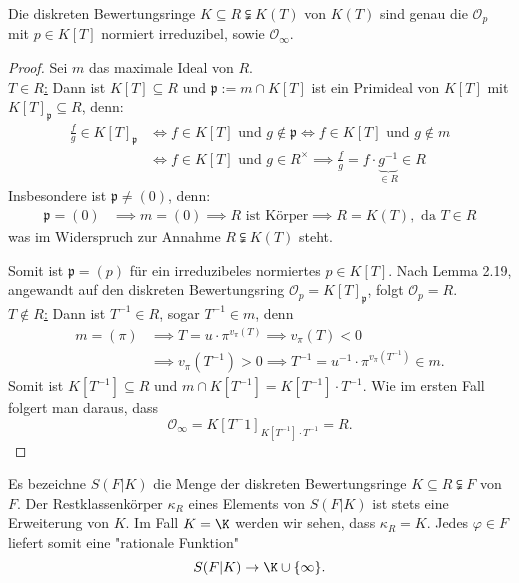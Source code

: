 \begin{satz}
    Die diskreten Bewertungsringe $K \subseteq R \subsetneqq K(T)$ von $K(T)$ sind genau die $\mathcal{O}_p$ mit 
    $p \in K[T]$ normiert irreduzibel, sowie $\mathcal{O}_\infty$.
\end{satz}
\begin{proof}
    Sei $m$ das maximale Ideal von $R$.\\
    \underline{$T\in R$:} Dann ist $K[T] \subseteq R$ und $\mathfrak{p} := m \cap K[T]$ ist ein Primideal von $K[T]$ mit
    $K[T]_\mathfrak{p} \subseteq R$, denn:
    \begin{align*}
        \frac{f}{g} \in K[T]_\mathfrak{p} & \iff f \in K[T] \text{ und } g \notin \mathfrak{p}
            \iff f \in K[T] \text{ und } g \notin m\\
            & \iff f \in K[T] \text{ und } g \in R^\times \implies \frac{f}{g} = f \cdot \underbrace{g^{-1}}_{\in R} \in R
    \end{align*}
    Insbesondere ist $\mathfrak{p} \ne (0)$, denn:
    \begin{align*}
        \mathfrak{p} = (0) & \implies m = (0) \implies R \text{ ist Körper} \implies R = K(T), \text{ da } T \in R
    \end{align*}
    was im Widerspruch zur Annahme $R \subsetneqq K(T)$ steht.

    Somit ist $\mathfrak{p} = (p)$ für ein irreduzibeles
    normiertes $p \in K[T]$. Nach Lemma 2.19, angewandt auf den diskreten Bewertungsring $\mathcal{O}_p = K[T]_\mathfrak{p}$,
    folgt $\mathcal{O}_p = R$.\\
    \underline{$T\notin R$:} Dann ist $T^{-1} \in R$, sogar $T^{-1} \in m$, denn
    \begin{align*}
        m=(\pi) &\implies T = u \cdot \pi^{v_\pi(T)} \implies v_\pi(T) < 0\\
            & \implies v_\pi(T^{-1}) > 0 \implies T^{-1} = u^{-1}\cdot \pi^{v_\pi(T^{-1})} \in m.
    \end{align*}
    Somit ist $K[T^{-1}] \subseteq R$ und $m \cap K[T^{-1}] = K[T^{-1}] \cdot T^{-1}$. Wie im ersten Fall folgert man daraus, dass
    $$ \mathcal{O}_\infty = K[T^-1]_{K[T^{-1}]\cdot T^{-1}} = R.$$
\end{proof}

\begin{bemerkungnr}
    Es bezeichne $S(F|K)$ die Menge der diskreten Bewertungsringe $K \subseteq R \subsetneqq F$ von $F$.
    Der Restklassenkörper $\kappa_R$ eines Elements von $S(F|K)$ ist stets eine Erweiterung von $K$.
    Im Fall $K = \K$ werden wir sehen, dass $\kappa_R = K$. Jedes $\varphi \in F$ liefert somit eine "rationale Funktion"
    $$ S(F|K) \to \K \cup \{\infty\}. $$
\end{bemerkungnr}

